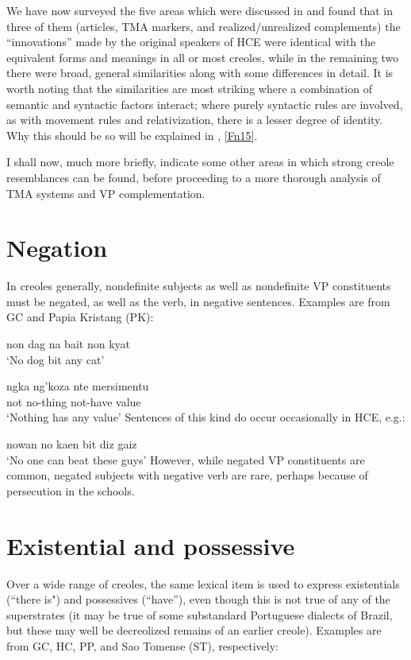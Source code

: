 We have now surveyed the five areas which were discussed in  and found that in three of them (articles, TMA markers, and realized/unrealized complements) the ``innovations'' made by the original speakers of HCE were identical with the equivalent forms and meanings in all or most creoles, while in the remaining two there were broad, general similarities along with some differences in detail. It is worth noting that the similarities are most striking where a combi\-nation of semantic and syntactic factors interact; where purely syntactic rules are involved, as with movement rules and relativization, there is a lesser degree of identity. Why this should be so will be explained in , \ref{Fn15}.

I shall now, much more briefly, indicate some other areas in which strong creole resemblances can be found, before proceeding to a more thorough analysis of TMA systems and VP complementation.

\section{Negation}

In creoles generally, nondefinite subjects as well as nondefinite VP constituents must be negated, as well as the verb, in negative sentences. Examples are from GC and Papia Kristang (PK):


\ea\label{ex:2:52}
 non dag na bait non kyat\\
\glt `No dog bit any cat'
\z

\ea\label{ex:2:53}
\gll ngka ng'koza nte mersimentu\\
 not no-thing not-have value \\
\glt `Nothing has any value'
\z
Sentences of this kind do occur occasionally in HCE, e.g.:

\ea\label{ex:2:54}
 nowan no kaen bit diz gaiz \\
\glt `No one can beat these guys'
\z
However, while negated VP constituents are common, negated subjects with negative verb are rare, perhaps because of persecution in the schools.

\section{Existential and possessive}

Over a wide range of creoles, the same lexical item is used to express existentials (``there is") and possessives (``have''), even though this is not true of any of the superstrates (it may be true of some substandard Portuguese dialects of Brazil, but these may well be decreolized remains of an earlier creole). Examples are from GC, HC, PP, and Sao Tomense (ST), respectively:

